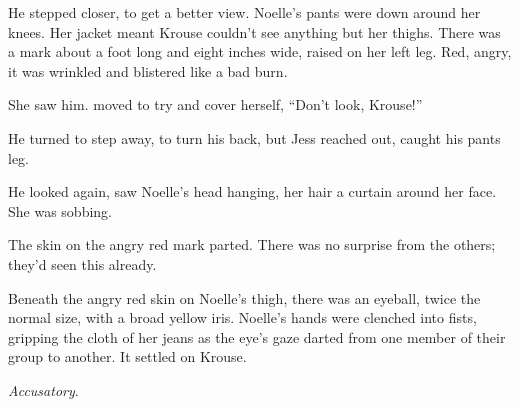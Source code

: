 He stepped closer, to get a better view.  Noelle's pants were down around her knees.  Her jacket meant Krouse couldn't see anything but her thighs.  There was a mark about a foot long and eight inches wide, raised on her left leg.  Red, angry, it was wrinkled and blistered like a bad burn.



She saw him. moved to try and cover herself, ``Don't look, Krouse!''



He turned to step away, to turn his back, but Jess reached out, caught his pants leg.



He looked again, saw Noelle's head hanging, her hair a curtain around her face.  She was sobbing.



The skin on the angry red mark parted.  There was no surprise from the others; they'd seen this already.



Beneath the angry red skin on Noelle's thigh, there was an eyeball, twice the normal size, with a broad yellow iris.  Noelle's hands were clenched into fists, gripping the cloth of her jeans as the eye's gaze darted from one member of their group to another.  It settled on Krouse.



\emph{Accusatory}.





